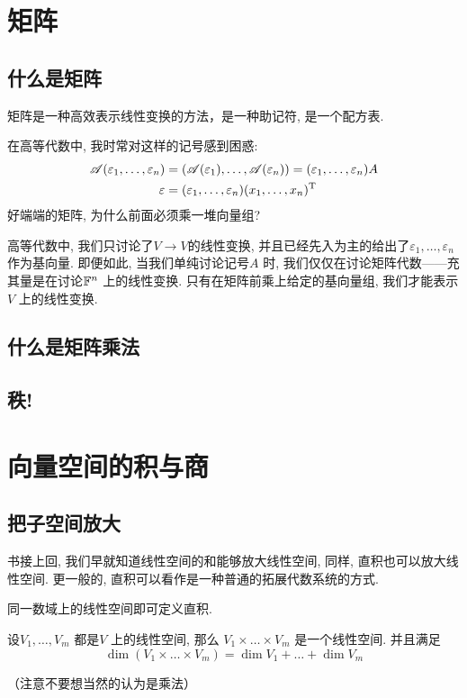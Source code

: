 \section{矩阵}
\subsection{什么是矩阵}
矩阵是一种高效表示线性变换的方法，是一种助记符, 是一个配方表.

在高等代数中, 我时常对这样的记号感到困惑:
\begin{align*}
    \mathscr{A}(\varepsilon_{1}, \dots, \varepsilon_{n}) &=
    (\mathscr{A}(\varepsilon_{1}), \dots,
    \mathscr{A}(\varepsilon_{n})) = (\varepsilon_{1},
    \dots, \varepsilon_{n})A\\
    \varepsilon &= (\varepsilon_{1}, \dots, \varepsilon_{n})
    (x_{1}, \dots,   x_{n})^{\mathrm{T}}
\end{align*}
好端端的矩阵, 为什么前面必须乘一堆向量组?

高等代数中, 我们只讨论了\(V \to V\)的线性变换,
并且已经先入为主的给出了\(\varepsilon_{1}, \dots, \varepsilon_{n}\) 作为基向量.
即便如此, 当我们单纯讨论记号\(A\) 时,
我们仅仅在讨论矩阵代数——充其量是在讨论\(\mathbb{F}^{n}\) 上的线性变换.
只有在矩阵前乘上给定的基向量组, 我们才能表示\(V\) 上的线性变换.

\subsection{什么是矩阵乘法}
\subsection{秩!}
\section{向量空间的积与商}
\subsection{把子空间放大}
书接上回, 我们早就知道线性空间的和能够放大线性空间, 同样, 直积也可以放大线性空间.
更一般的, 直积可以看作是一种普通的拓展代数系统的方式.

同一数域上的线性空间即可定义直积.

\begin{theorem}
    设\(V_1, \dots , V_{m}\) 都是\(V\) 上的线性空间, 那么 \(V_{1}
    \times \dots \times V_{m}\) 是一个线性空间. 并且满足\[
        \dim (V_{1} \times \dots \times V_{m}) = \dim V_{1}
        + \dots + \dim V_{m}
    \]
\end{theorem}
（注意不要想当然的认为是乘法）

